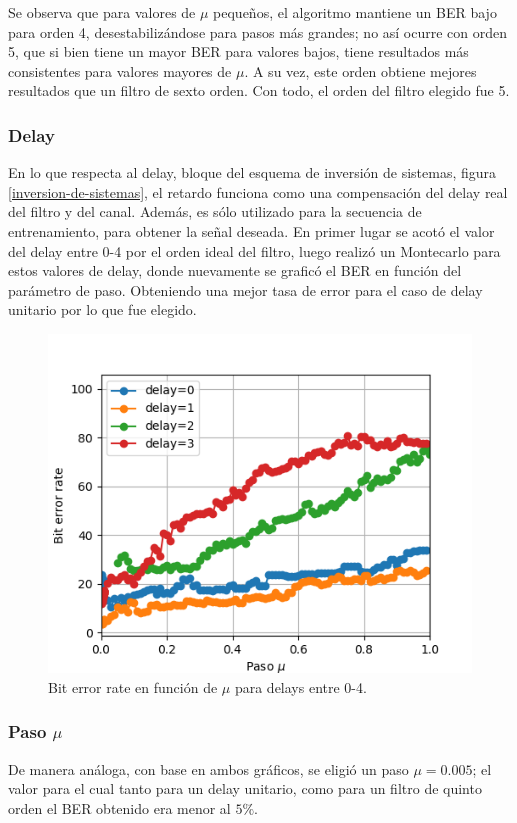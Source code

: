 \documentclass[main.tex]{subfiles}
\begin{document}
Se observa que para valores de $\mu$ pequeños, el algoritmo mantiene un BER bajo 
para orden 4, desestabilizándose para pasos más grandes; no así ocurre con orden 5, 
que si bien tiene un mayor BER para valores bajos, tiene resultados más consistentes
para valores mayores de $\mu$. A su vez, este orden obtiene mejores resultados que un 
filtro de sexto orden. Con todo, el orden del filtro elegido fue 5.

\subsubsection*{Delay}
En lo que respecta al delay, bloque del esquema de inversión de sistemas, 
figura \ref{inversion-de-sistemas}, el retardo funciona como una compensación del delay real
del filtro y del canal. Además, es sólo utilizado para la secuencia de entrenamiento, para obtener la señal deseada.
En primer lugar se acotó el valor del delay entre 0-4 por el orden ideal del filtro, 
luego realizó un Montecarlo para estos valores de delay, donde nuevamente se
graficó el BER en función del parámetro de paso. Obteniendo una mejor tasa de error 
para el caso de delay unitario por lo que fue elegido.
\begin{figure}[H]
    \centering
    \includegraphics[scale=0.6]{imagenes/delay.png}
    \caption{Bit error rate en función de $\mu$ para delays entre 0-4.}
\end{figure}

\subsubsection*{Paso $\mu$}
De manera análoga, con base en ambos gráficos, se eligió un paso $\mu=0.005$; el valor
para el cual tanto para un  delay unitario, como para un filtro de quinto orden
el BER obtenido era menor al $5\%$.
\end{document}
